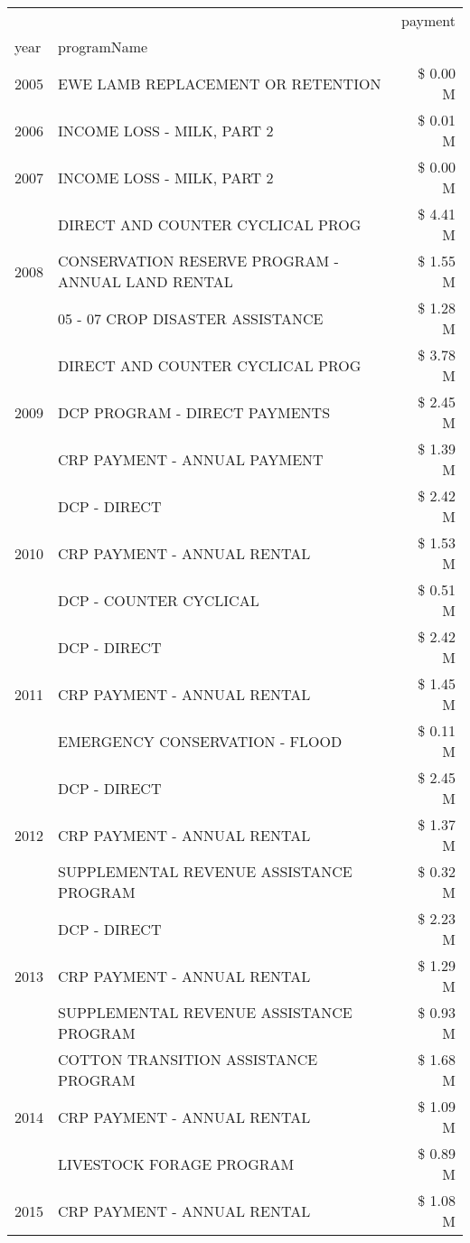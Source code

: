 \begin{tabular}{llr}
\toprule
 &  & payment \\
year & programName &  \\
\midrule
2005 & EWE LAMB REPLACEMENT OR RETENTION & \$ 0.00 M \\
\cline{1-3}
2006 & INCOME LOSS - MILK, PART 2 & \$ 0.01 M \\
\cline{1-3}
2007 & INCOME LOSS - MILK, PART 2 & \$ 0.00 M \\
\cline{1-3}
\multirow[t]{3}{*}{2008} & DIRECT AND COUNTER CYCLICAL PROG & \$ 4.41 M \\
 & CONSERVATION RESERVE PROGRAM - ANNUAL LAND RENTAL & \$ 1.55 M \\
 & 05 - 07 CROP DISASTER ASSISTANCE & \$ 1.28 M \\
\cline{1-3}
\multirow[t]{3}{*}{2009} & DIRECT AND COUNTER CYCLICAL PROG & \$ 3.78 M \\
 & DCP PROGRAM - DIRECT PAYMENTS & \$ 2.45 M \\
 & CRP PAYMENT - ANNUAL PAYMENT & \$ 1.39 M \\
\cline{1-3}
\multirow[t]{3}{*}{2010} & DCP - DIRECT & \$ 2.42 M \\
 & CRP PAYMENT - ANNUAL RENTAL & \$ 1.53 M \\
 & DCP - COUNTER CYCLICAL & \$ 0.51 M \\
\cline{1-3}
\multirow[t]{3}{*}{2011} & DCP - DIRECT & \$ 2.42 M \\
 & CRP PAYMENT - ANNUAL RENTAL & \$ 1.45 M \\
 & EMERGENCY CONSERVATION - FLOOD & \$ 0.11 M \\
\cline{1-3}
\multirow[t]{3}{*}{2012} & DCP - DIRECT & \$ 2.45 M \\
 & CRP PAYMENT - ANNUAL RENTAL & \$ 1.37 M \\
 & SUPPLEMENTAL REVENUE ASSISTANCE PROGRAM & \$ 0.32 M \\
\cline{1-3}
\multirow[t]{3}{*}{2013} & DCP - DIRECT & \$ 2.23 M \\
 & CRP PAYMENT - ANNUAL RENTAL & \$ 1.29 M \\
 & SUPPLEMENTAL REVENUE ASSISTANCE PROGRAM & \$ 0.93 M \\
\cline{1-3}
\multirow[t]{3}{*}{2014} & COTTON TRANSITION ASSISTANCE PROGRAM & \$ 1.68 M \\
 & CRP PAYMENT - ANNUAL RENTAL & \$ 1.09 M \\
 & LIVESTOCK FORAGE PROGRAM & \$ 0.89 M \\
\cline{1-3}
\multirow[t]{3}{*}{2015} & CRP PAYMENT - ANNUAL RENTAL & \$ 1.08 M \\

\end{tabular}
